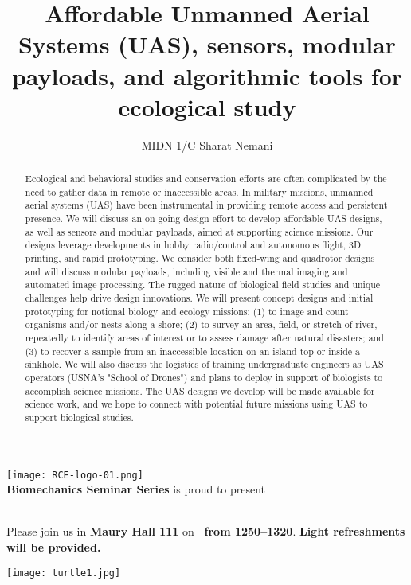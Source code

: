 \documentclass{article}
\author{MIDN 1/C Sharat Nemani}
\title{Affordable Unmanned Aerial Systems (UAS), sensors, modular payloads, and algorithmic tools for ecological study}
\date{\printdate{2/28/2019}}
\begin{document}
\thispagestyle{empty}
\makeatletter
\vfill
\begin{center}
\texttt{[image: RCE-logo-01.png]}\\
\textbf{Biomechanics Seminar Series} is proud to present\\
\vspace{1em}
\textbf{\Large\@author}\\
\vspace{1em}
\textbf{\Large\@title}
\end{center}
\makeatother

\begin{abstract}
Ecological and behavioral studies and conservation efforts are often complicated by the need to gather data in remote or inaccessible areas. In military missions, unmanned aerial systems (UAS) have been instrumental in providing remote access and persistent presence. We will discuss an on-going design effort to develop affordable UAS designs, as well as sensors and modular payloads, aimed at supporting science missions.  Our designs leverage developments in hobby radio/control and autonomous flight, 3D printing, and rapid prototyping. We consider both fixed-wing and quadrotor designs and will discuss modular payloads, including visible and thermal imaging and automated image processing. The rugged nature of biological field studies and unique challenges help drive design innovations. We will present concept designs and initial prototyping for notional biology and ecology missions: (1) to image and count organisms and/or nests along a shore; (2) to survey an area, field, or stretch of river, repeatedly to identify areas of interest or to assess damage after natural disasters; and (3) to recover a sample from an inaccessible location on an island top or inside a sinkhole. We will also discuss the logistics of training undergraduate engineers as UAS operators (USNA's "School of Drones") and plans to deploy in support of biologists to accomplish science missions. The UAS designs we develop will be made available for science work, and we hope to connect with potential future missions using UAS to support biological studies.
\end{abstract}

\makeatletter
Please join us in \textbf{Maury Hall 111} on \textbf{\@date\ from 1250--1320}. \textbf{Light refreshments will be provided.}
\makeatother
\vfill

\begin{center}
\texttt{[image: turtle1.jpg]}
\end{center}
\vfill
\end{document}
